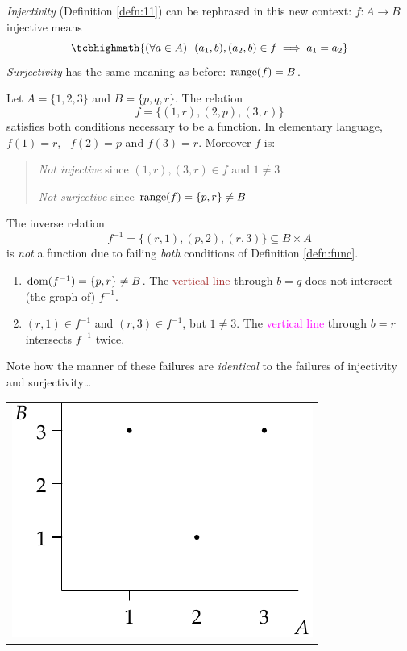 \emph{Injectivity} (Definition \ref{defn:11}) can be rephrased in this new context: $f:A\to B$ injective means
\[
	\tcbhighmath{(\forall a\in A)\ \ (a_1,b),(a_2,b)\in f\implies a_1=a_2}
\]
\emph{Surjectivity} has the same meaning as before: $\operatorname{range}(f)=B$.

\goodbreak


\begin{example}[lower separated=false, sidebyside, sidebyside align=top seam, sidebyside gap=0pt, righthand width=0.33\linewidth]{}{}
	Let $A=\{1,2,3\}$ and $B=\{p,q,r\}$. The relation
	\[
		f=\bigl\{(1,r),(2,p),(3,r)\bigr\}
	\]
	satisfies both conditions necessary to be a function. In elementary language, $f(1)=r$, \ $f(2)=p$ and $f(3)=r$. Moreover $f$ is:
	\begin{quote}
		\emph{Not injective} since $(1,r),(3,r)\in f$ and $1\neq 3$\par
		\emph{Not surjective} since $\operatorname{range}(f)=\{p,r\}\neq B$
	\end{quote}
	The inverse relation
	\[
		f^{-1}=\bigl\{(r,1),(p,2),(r,3)\bigr\}\subseteq B\times A
	\]
	is \emph{not} a function due to failing \emph{both} conditions of Definition \ref{defn:func}.
	\begin{enumerate}
		 \item $\operatorname{dom}(f^{-1})=\{p,r\} \neq B$. The \textcolor{Brown}{vertical line} through $b=q$ does not intersect (the graph of) $f^{-1}$.
		 \item $(r,1)\in f^{-1}$ and $(r,3)\in f^{-1}$, but $1\neq 3$. The \textcolor{magenta}{vertical line} through $b=r$ intersects $f^{-1}$ twice.
	\end{enumerate}
	Note how the manner of these failures are \emph{identical} to the failures of injectivity and surjectivity\ldots
	\tcblower
	\hfill
	\begin{tabular}{@{}c@{}}
		\includegraphics{relations-18-reln1}\\

\end{tabular}
\end{example}
